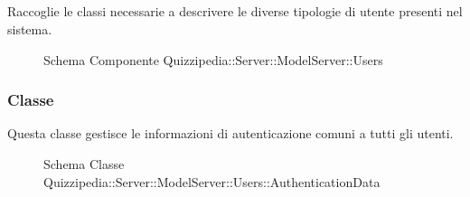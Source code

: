 \subsection{}
Raccoglie le classi necessarie a descrivere le diverse tipologie di utente presenti nel sistema.
\begin{figure}[H]
\centering
\noindent{}
\caption[Schema Componente Quizzipedia::Server::ModelServer::Users]{Schema Componente Quizzipedia::Server::ModelServer::Users}
\end{figure}
\subsubsection{Classe }
Questa classe gestisce le informazioni di autenticazione comuni a tutti gli utenti.
\begin{figure}[H]
\centering
\noindent{}
\caption[Schema Classe AuthenticationData]{Schema Classe Quizzipedia::Server::ModelServer::Users::AuthenticationData}
\end{figure}
